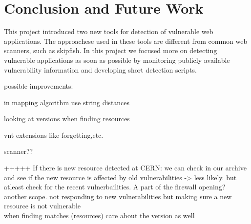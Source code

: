 \chapter{Conclusion and Future Work}
\label{conclusion-and-future-work}
\thispagestyle{empty}

This project introduced two new tools for detection of vulnerable web applications. The approachese used in these tools are different from common web scanners, such as skipfish. In this project we focused more on detecting vulnerable applications as soon as possible by monitoring publicly available vulnerability information and developing short detection scripts. 




possible improvements:

in mapping algorithm use string distances

looking at versions when finding resources

vnt extensions like forgetting,etc. 

scanner??


+++++
If there is new resource detected at CERN: we can check in our archive and see if the new resource is affected by old vulnerabilities -> less likely. but atleast check for the recent vulnerbailities. A part of the firewall opening? 
another scope. not responding to new vulnerabilities but making sure a new resource is not vulnerable
\\
when finding matches (resources) care about the version as well



